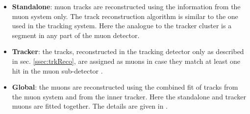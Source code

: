 \begin{itemize}
 \item \textbf{Standalone}: muon tracks are reconstructed using the information from the muon system only. The track reconstruction
 algorithm \cite{TWiki:GlobalMuon} is similar to the one used in the tracking system. Here the analogue to the
 tracker cluster is a segment in any part of the muon detector.
 
 \item \textbf{Tracker}: the tracks, reconstructed in the tracking detector only as described in sec. \ref{ssec:trkReco}, 
 are assigned as muons in case they match at least one hit in the muon sub-detector \cite{TWiki:GlobalMuon}.
 
 \item \textbf{Global}: the muons are reconstructed using 
 the combined fit of tracks from the muon system and from the inner tracker. Here the standalone and tracker muons are fitted together. The details are given
 in \cite{TWiki:GlobalMuon}.
\end{itemize}

